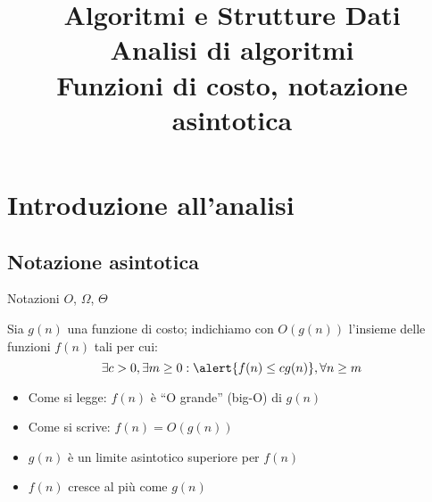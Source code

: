\title[ASD - Analisi di algoritmi]{\textbf{Algoritmi e Strutture Dati}\\[18pt]Analisi di algoritmi\\Funzioni di costo, notazione asintotica}


\FrameTitle{}


\section{Introduzione all'analisi}

\subsection{Notazione asintotica}

\begin{frame}{Notazioni $O$, $\Omega$, $\Theta$}

\vspace{-9pt}
\begin{myboxtitle}
Sia $g(n)$ una funzione di costo; indichiamo con $O(g(n))$ l'insieme
delle funzioni $f(n)$ tali per cui:\\[-6pt]
\[
  \exists c>0, \exists m \geq 0: \alert{f(n) \leq cg(n)}, \forall n \geq m
\]
\end{myboxtitle}

\medskip
\begin{itemize}
\item Come si legge: $f(n)$ è “\alert{O grande}” (big-O) di $g(n)$
\item Come si scrive: $f(n) = O(g(n))$
\item $g(n)$ è un \alert{limite asintotico superiore} per $f(n)$
\item $f(n)$ cresce al più come $g(n)$
\end{itemize}

\end{frame}

